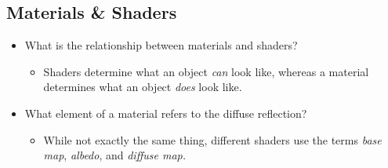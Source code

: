 \documentclass{article}
\begin{document}
\subsection{Materials \& Shaders}
\begin{itemize}
   
    \item What is the relationship between materials and shaders?
    \begin{itemize}
        \item Shaders determine what an object \textit{can} look like, whereas a material determines what an object \textit{does} look like.
    \end{itemize}
    
    \item What element of a material refers to the diffuse reflection?
    \begin{itemize}
        \item While not exactly the same thing, different shaders use the terms \textit{base map}, \textit{albedo}, and \textit{diffuse map.}
    \end{itemize}
    

\end{itemize}
\end{document}
